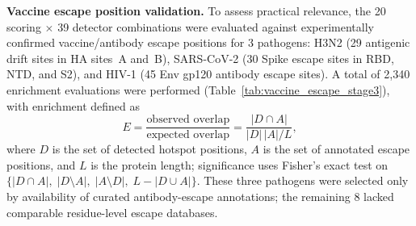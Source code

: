 \textbf{Vaccine escape position validation.}
To assess practical relevance, the 20 scoring $\times$ 39 detector combinations were evaluated against experimentally confirmed vaccine/antibody escape positions for 3 pathogens: H3N2 (29 antigenic drift sites in HA sites~A and~B), SARS-CoV-2 (30 Spike escape sites in RBD, NTD, and S2), and HIV-1 (45 Env gp120 antibody escape sites). A total of 2,340 enrichment evaluations were performed (Table~\ref{tab:vaccine_escape_stage3}), with enrichment defined as
\[
E = \frac{\text{observed overlap}}{\text{expected overlap}} = \frac{|D \cap A|}{|D|\,|A|/L},
\]
where $D$ is the set of detected hotspot positions, $A$ is the set of annotated escape positions, and $L$ is the protein length; significance uses Fisher's exact test on $\{|D \cap A|,\;|D \setminus A|,\;|A \setminus D|,\;L - |D \cup A|\}$. These three pathogens were selected only by availability of curated antibody-escape annotations; the remaining 8 lacked comparable residue-level escape databases.

